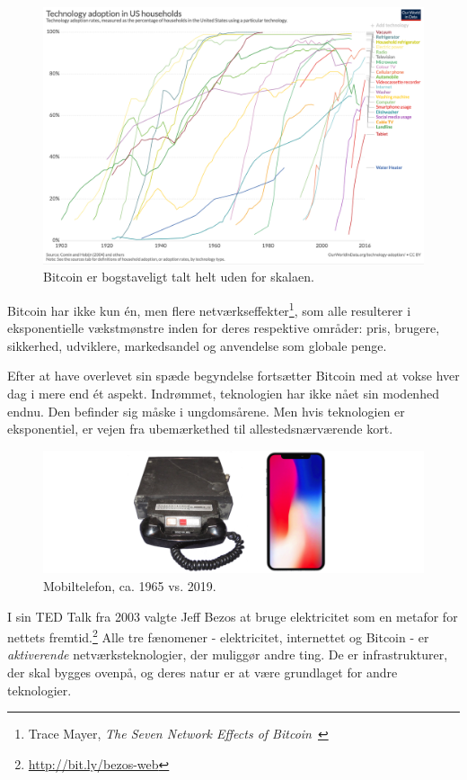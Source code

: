 \documentclass[paper=6in:9in,pagesize=pdftex,
               headinclude=on,footinclude=on,12pt]{scrbook}
\begin{document}
\begin{figure}
  \includegraphics{assets/images/tech-adoption.png}
  \caption{Bitcoin er bogstaveligt talt helt uden for skalaen.}
  \label{fig:tech-adoption}
\end{figure}

Bitcoin har ikke kun \'en, men flere netværkseffekter\footnote{Trace Mayer, \textit{The Seven Network Effects of Bitcoin}~\cite{7-network-effects}}, som alle resulterer i eksponentielle vækstmønstre inden for deres respektive områder: pris, brugere, sikkerhed, udviklere, markedsandel og anvendelse som globale penge.

Efter at have overlevet sin spæde begyndelse fortsætter Bitcoin med at vokse hver dag i mere end \'et aspekt. Indrømmet, teknologien har ikke nået sin modenhed endnu. Den befinder sig måske i ungdomsårene. Men hvis teknologien er eksponentiel, er vejen fra ubemærkethed til allestedsnærværende kort.\begin{figure}
  \includegraphics{assets/images/mobile-phone.png}
  \caption{Mobiltelefon, ca. 1965 vs. 2019.}
  \label{fig:mobile-phone}
\end{figure}

I sin TED Talk fra 2003 valgte Jeff Bezos at bruge elektricitet som en metafor for nettets fremtid.\footnote{\url{http://bit.ly/bezos-web}} Alle tre fænomener - elektricitet, internettet og Bitcoin - er \textit{aktiverende} netværksteknologier, der muliggør andre ting. De er infrastrukturer, der skal bygges ovenpå, og deres natur er at være grundlaget for andre teknologier.
\end{document}
